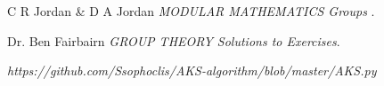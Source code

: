 \documentclass[11pt,a4paper]{article}
\begin{document}
\begin{enumerate}[1.]
\end{enumerate}
	
	\begin{thebibliography}{unsrt}
		
		C R Jordan \& D A Jordan \emph{MODULAR MATHEMATICS Groups }.
		
		Dr. Ben Fairbairn \emph{GROUP THEORY Solutions to Exercises}.
		
		\emph{https://github.com/Ssophoclis/AKS-algorithm/blob/master/AKS.py}
		
	\end{thebibliography}
	
\end{document}
